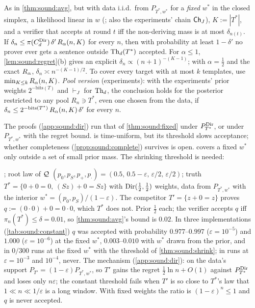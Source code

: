 \begin{theorem}\label{thm:sound:shrink}
As in \cref{thm:sound:avg}, but with data i.i.d.\ from $P_{T^*,w^*}$ for a \emph{fixed} $w^*$ in the closed simplex, a likelihood linear in $w$ (\Lzero; also the experiments' chain $\mathsf{Ch}_{J}$), $K:=|T^*|$, and a verifier that accepts at round $t$ iff the non-deriving mass is at most $\delta_{n(t)}$. If $\delta_n\le\pi(C^{\mathrm{Dir}}_d)\,\delta'\,R_{\alpha}(n,K)$ for every $n$, then with probability at least $1-\delta'$ no prover ever gets a sentence outside $\mathrm{Th}_d(T^*)$ accepted. For $\alpha\le1$, \cref{lem:sound:regret}(b) gives an explicit $\delta_n\propto(n+1)^{-(K-1)}$; with $\alpha=\tfrac12$ and the exact $R_{\alpha}$, $\delta_n\asymp n^{-(K-1)/2}$. To cover every target with at most $k$ templates, use $\min_{K\le k}R_{\alpha}(n,K)$.
\emph{Pool version} (experiments): with the experiments' prior weights $2^{-\mathrm{bits}(T)}$ and $\vdash_J$ for $\mathrm{Th}_d$, the conclusion holds for the posterior restricted to any pool $R_n\ni T^*$, even one chosen from the data, if $\delta_n\le2^{-\mathrm{bits}(T^*)}\,R_{\alpha}(n,K)\,\delta'$ for every $n$.
\end{theorem}

\noindent The proofs (\cref{app:sound:dir}) run that of \cref{thm:sound:fixed} under $P^{\mathrm{Dir}}_{T^*}$, or under $P_{T^*,w^*}$ with the regret bound.  is time-uniform, but its threshold slows acceptance; whether completeness (\cref{prop:sound:complete}) survives is open.  covers a fixed $w^*$ only outside a set of small prior mass. The shrinking threshold is needed:

\begin{example}\label{ex:sound:constant}
\Lzero; root law of $\mathcal{Q}$ $(p_0,p_S,p_+,p_\cdot)=(0.5,\,0.5-\varepsilon,\,\varepsilon/2,\,\varepsilon/2)$; truth $T^*=\{0+0=0,\ (Sz)+0=Sz\}$ with $\mathrm{Dir}(\tfrac12,\tfrac12)$ weights, data from $P_{T^*,w^*}$ with the interior $w^*=(p_0,p_S)/(1-\varepsilon)$. The competitor $T'=\{z+0=z\}$ proves $q:=(0\cdot0)+0=0\cdot0$, which $T^*$ does not. Prior $\tfrac12$ each; the verifier accepts $q$ iff $\pi_n(T^*)\le\delta=0.01$, so \cref{thm:sound:avg}'s bound is $0.02$. In three implementations (\cref{tab:sound:constant}) $q$ was accepted with probability $0.977$--$0.997$ ($\varepsilon=10^{-5}$) and $1.000$ ($\varepsilon=10^{-6}$) at the fixed $w^*$, $0.003$--$0.010$ with $w^*$ drawn from the prior, and in $0/300$ runs at the fixed $w^*$ with the threshold of \cref{thm:sound:shrink}; in runs at $\varepsilon=10^{-3}$ and $10^{-4}$, never. The mechanism (\cref{app:sound:dir}): on the data's support $P_{T'}=(1-\varepsilon)P_{T^*,w^*}$, so $T'$ gains the regret $\tfrac12\ln n+O(1)$ against $P^{\mathrm{Dir}}_{T^*}$ and loses only $n\varepsilon$; the constant threshold fails when $T'$ is so close to $T^*$'s law that $1\ll n\ll1/\varepsilon$ is a long window. With fixed weights the ratio is $(1-\varepsilon)^n\le1$ and $q$ is never accepted.
\end{example}

